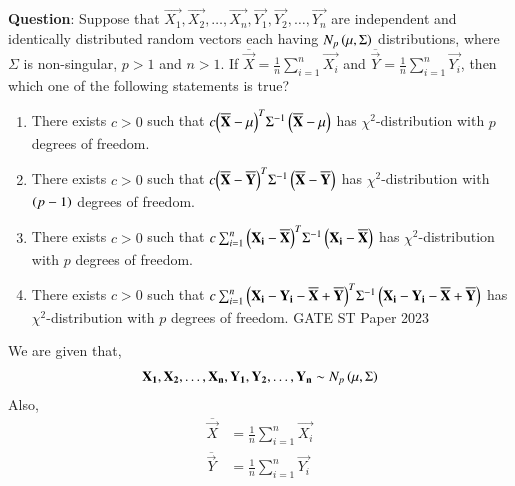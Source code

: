 \documentclass[journal,12pt,onecolumn]{IEEEtran}
\theoremstyle{remark}
\begin{document}
%
\textbf{Question}:
Suppose that $\vec{X_1}, \vec{X_2},\ldots, \vec{X_n}, \vec{Y_1}, \vec{Y_2},\ldots, \vec{Y_n}$ are independent and identically distributed random vectors each having $N_p\left(\mathbf{\mu},\Sigma\right)$ distributions, where $\Sigma$ is non-singular, $p>1$ and $n>1$. If $\overline{\vec{X}} = \frac{1}{n}\sum_{i=1}^{n}\vec{X_i}$ and $\overline{\vec{Y}} = \frac{1}{n}\sum_{i=1}^{n}\vec{Y_i}$, then which one of the following statements is true?
\begin{enumerate}[label=(\alph*)]
\item There exists $c>0$ such that $c{\left(\overline{\mathbf{X}}-\mathbf{\mu}\right)}^T{\Sigma}^{-1}\left(\overline{\mathbf{X}}-\mathbf{\mu}\right)$ has ${\chi}^2$-distribution with $p$ degrees of freedom.
\item There exists $c>0$ such that $c{\left(\overline{\mathbf{X}}-\overline{\mathbf{Y}}\right)^T}{\Sigma}^{-1}\left(\overline{\mathbf{X}}-\overline{\mathbf{Y}}\right)$ has ${\chi}^2$-distribution with $\left(p-1\right)$ degrees of freedom.
\item There exists $c>0$ such that $c\sum_{i=1}^n{\left(\mathbf{X_i}-\overline{\mathbf{X}}\right)}^T{\Sigma}^{-1}\left(\mathbf{X_i}-\overline{\mathbf{X}}\right)$ has ${\chi}^2$-distribution with $p$ degrees of freedom.
\item There exists $c>0$ such that $c\sum_{i=1}^n{\left(\mathbf{X_i}-\mathbf{Y_i}-\overline{\mathbf{X}}+\overline{\mathbf{Y}}\right)}^T{\Sigma}^{-1}\left(\mathbf{X_i}-\mathbf{Y_i}-\overline{\mathbf{X}}+\overline{\mathbf{Y}}\right)$ has ${\chi}^2$-distribution with $p$ degrees of freedom.   \hfill{GATE ST Paper 2023} 
\end{enumerate}    
\solution
\newline
We are given that,
\begin{align}
\mathbf{X_1}, \mathbf{X_2},\ldots, \mathbf{X_n}, \mathbf{Y_1}, \mathbf{Y_2},\ldots, \mathbf{Y_n} \sim N_p\left(\mathbf{\mu},\Sigma\right)
\end{align}
Also,
\begin{align}
\overline{\vec{X}} &= \frac{1}{n}\sum_{i=1}^{n}\vec{X_i} \\
\overline{\vec{Y}} &= \frac{1}{n}\sum_{i=1}^{n}\vec{Y_i} 
\end{align}
\end{document}
